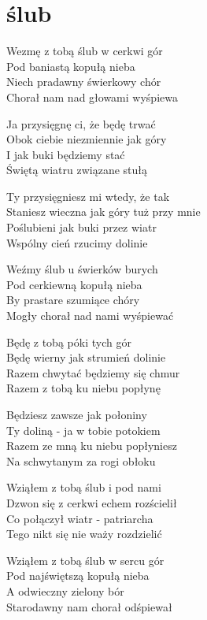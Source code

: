 \section{ślub}
\begin{text}
Wezmę z tobą ślub w cerkwi gór\\
Pod baniastą kopułą nieba\\
Niech pradawny świerkowy chór\\
Chorał nam nad głowami wyśpiewa

Ja przysięgnę ci, że będę trwać\\
Obok ciebie niezmiennie jak góry\\
I jak buki będziemy stać\\
Świętą wiatru związane stułą

Ty przysięgniesz mi wtedy, że tak\\
Staniesz wieczna jak góry tuż przy mnie\\
Poślubieni jak buki przez wiatr\\
Wspólny cień rzucimy dolinie

Weźmy ślub u świerków burych\\
Pod cerkiewną kopułą nieba\\
By prastare szumiące chóry\\
Mogły chorał nad nami wyśpiewać

Będę z tobą póki tych gór\\
Będę wierny jak strumień dolinie\\
Razem chwytać będziemy się chmur\\
Razem z tobą ku niebu popłynę

Będziesz zawsze jak połoniny\\
Ty doliną - ja w tobie potokiem\\
Razem ze mną ku niebu popłyniesz\\
Na schwytanym za rogi obłoku

Wziąłem z tobą ślub i pod nami\\
Dzwon się z cerkwi echem rozścielił\\
Co połączył wiatr - patriarcha\\
Tego nikt się nie waży rozdzielić

Wziąłem z tobą ślub w sercu gór\\
Pod najświętszą kopułą nieba\\
A odwieczny zielony bór\\
Starodawny nam chorał odśpiewał
\end{text}